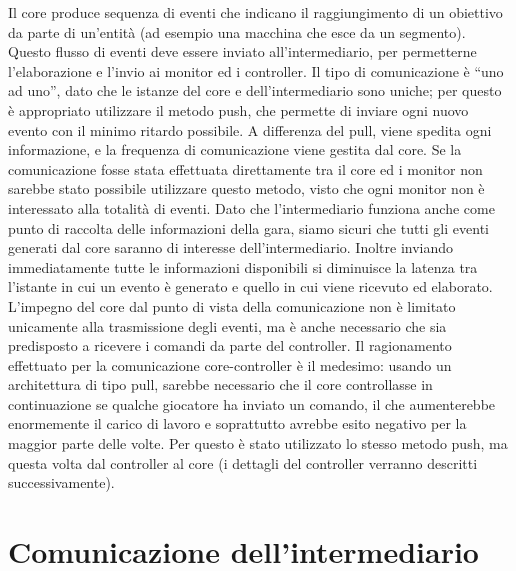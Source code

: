 Il core produce sequenza di eventi che indicano il raggiungimento di un obiettivo da parte di un’entità (ad esempio una macchina che esce da un segmento).
Questo flusso di eventi deve essere inviato all’intermediario, per permetterne l’elaborazione e l’invio ai monitor ed i controller.
Il tipo di comunicazione è “uno ad uno”, dato che le istanze del core e dell’intermediario sono uniche; per questo è appropriato utilizzare il metodo push, che permette di inviare ogni nuovo evento con il minimo ritardo possibile.
A differenza del pull, viene spedita ogni informazione, e la frequenza di comunicazione viene gestita dal core. Se la comunicazione fosse stata effettuata direttamente tra il core ed i monitor non sarebbe stato possibile utilizzare questo metodo, visto che ogni monitor non è interessato alla totalità di eventi. Dato che l’intermediario funziona anche come punto di raccolta delle informazioni della gara, siamo sicuri che tutti gli eventi generati dal core saranno di interesse dell’intermediario. Inoltre inviando immediatamente tutte le informazioni disponibili si diminuisce la latenza tra l’istante in cui un evento è generato e quello in cui viene ricevuto ed elaborato. \\
L’impegno del core dal punto di vista della comunicazione non è limitato unicamente alla trasmissione degli eventi, ma è anche necessario che sia predisposto a ricevere i comandi da parte del controller. Il ragionamento effettuato per la comunicazione core-controller è il medesimo: usando un architettura di tipo pull, sarebbe necessario che il core controllasse in continuazione se qualche giocatore ha inviato un comando, il che aumenterebbe enormemente il carico di lavoro e soprattutto avrebbe esito negativo per la maggior parte delle volte. Per questo è stato utilizzato lo stesso metodo push, ma questa volta dal controller al core (i dettagli del controller verranno descritti successivamente).


\section{Comunicazione dell’intermediario}

